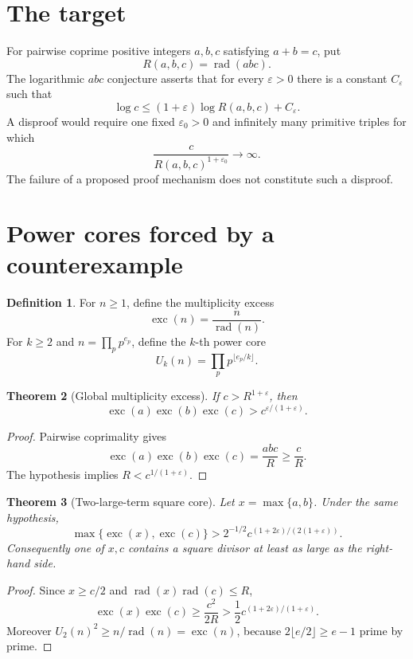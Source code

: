 \documentclass[11pt]{amsart}
\newtheorem{theorem}{Theorem}[section]
\theoremstyle{definition}
\newtheorem{definition}[theorem]{Definition}
\theoremstyle{remark}
\newcommand{\rad}{\operatorname{rad}}
\newcommand{\eps}{\varepsilon}
\begin{document}
\section{The target}

For pairwise coprime positive integers $a,b,c$ satisfying $a+b=c$, put
\[
 R(a,b,c)=\rad(abc).
\]
The logarithmic $abc$ conjecture asserts that for every $\eps>0$ there is a constant $C_\eps$ such that
\[
 \log c\le (1+\eps)\log R(a,b,c)+C_\eps.
\]
A disproof would require one fixed $\eps_0>0$ and infinitely many primitive triples for which
\[
 \frac{c}{R(a,b,c)^{1+\eps_0}}\longrightarrow\infty.
\]
The failure of a proposed proof mechanism does not constitute such a disproof.

\section{Power cores forced by a counterexample}

\begin{definition}
For $n\ge1$, define the multiplicity excess
\[
 \operatorname{exc}(n)=\frac{n}{\rad(n)}.
\]
For $k\ge2$ and $n=\prod_pp^{e_p}$, define the $k$-th power core
\[
 U_k(n)=\prod_pp^{\lfloor e_p/k\rfloor}.
\]
\end{definition}

\begin{theorem}[Global multiplicity excess]
If $c>R^{1+\eps}$, then
\[
 \operatorname{exc}(a)\operatorname{exc}(b)\operatorname{exc}(c)
 >c^{\eps/(1+\eps)}.
\]
\end{theorem}

\begin{proof}
Pairwise coprimality gives
\[
 \operatorname{exc}(a)\operatorname{exc}(b)\operatorname{exc}(c)
 =\frac{abc}{R}\ge\frac cR.
\]
The hypothesis implies $R<c^{1/(1+\eps)}$.
\end{proof}

\begin{theorem}[Two-large-term square core]
Let $x=\max\{a,b\}$.  Under the same hypothesis,
\[
 \max\{\operatorname{exc}(x),\operatorname{exc}(c)\}
 >2^{-1/2}c^{(1+2\eps)/(2(1+\eps))}.
\]
Consequently one of $x,c$ contains a square divisor at least as large as the right-hand side.
\end{theorem}

\begin{proof}
Since $x\ge c/2$ and $\rad(x)\rad(c)\le R$,
\[
 \operatorname{exc}(x)\operatorname{exc}(c)
 \ge \frac{c^2}{2R}
 >\frac12c^{(1+2\eps)/(1+\eps)}.
\]
Moreover $U_2(n)^2\ge n/\rad(n)=\operatorname{exc}(n)$, because
$2\lfloor e/2\rfloor\ge e-1$ prime by prime.
\end{proof}
\end{document}
